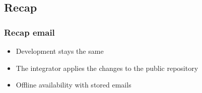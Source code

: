 \subsection{Recap}
\begin{frame}
    \frametitle{Recap email}
    \begin{itemize}
        \item Development stays the same
        \item The integrator applies the changes to the public repository
        \item Offline availability with stored emails
    \end{itemize}
\end{frame}

